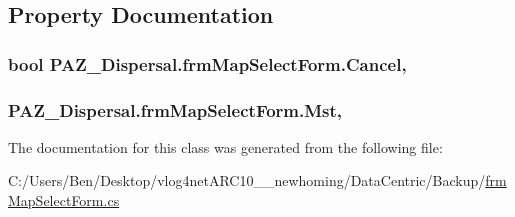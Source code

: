\subsection{Property Documentation}
\hypertarget{class_p_a_z___dispersal_1_1frm_map_select_form_ab0de9445932eb18d83175b8b478a69a0}{
\subsubsection[{Cancel}]{\setlength{\rightskip}{0pt plus 5cm}bool P\-A\-Z\-\_\-\-Dispersal.\-frm\-Map\-Select\-Form.\-Cancel\hspace{0.3cm}{\ttfamily [get]}, {\ttfamily [set]}}}\label{class_p_a_z___dispersal_1_1frm_map_select_form_ab0de9445932eb18d83175b8b478a69a0}
\hypertarget{class_p_a_z___dispersal_1_1frm_map_select_form_ae8f312c83543b33039bba554d1bba5d6}{
\subsubsection[{Mst}]{ P\-A\-Z\-\_\-\-Dispersal.\-frm\-Map\-Select\-Form.\-Mst\hspace{0.3cm}{\ttfamily [get]}, {\ttfamily [set]}}}\label{class_p_a_z___dispersal_1_1frm_map_select_form_ae8f312c83543b33039bba554d1bba5d6}


The documentation for this class was generated from the following file\-:\begin{DoxyCompactItemize}
\item 
C\-:/\-Users/\-Ben/\-Desktop/vlog4net\-A\-R\-C10\-\_\-\_\-newhoming/\-Data\-Centric/\-Backup/\hyperlink{_backup_2frm_map_select_form_8cs}{frm\-Map\-Select\-Form.\-cs}\end{DoxyCompactItemize}
